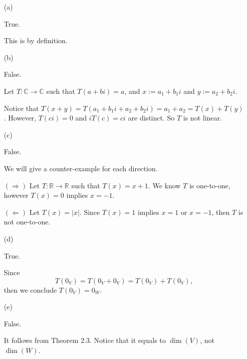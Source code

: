 \begin{Exercise}
	\begin{enumerate}[(a)]
		\item[(a)]
		\begin{answer}
			True.
		\end{answer}
		\begin{solution}
			This is by definition.
		\end{solution}
		
		\item[(b)]
		\begin{answer}
			False.
		\end{answer}
		\begin{solution}
			Let $T:\mathbb{C}\to\mathbb{C}$ such that $T(a+b i) = a$, and $x := a_1 + b_1 i$ and $y := a_2 + b_2 i$.
			
			Notice that $T(x+y) = T(a_1 + b_1 i + a_2 + b_2 i) = a_1 + a_2 = T(x) + T(y)$. However, $T(c i) = 0$ and $i T(c) = c i$ are distinct. So $T$ is not linear.
		\end{solution}
		
		\item[(c)]
		\begin{answer}
			False.
		\end{answer}
		\begin{solution}
			We will give a counter-example for each direction.
			
			$(\Longrightarrow)$
			Let $T:\mathbb{R}\to\mathbb{R}$ such that $T(x) = x+1$. We know $T$ is one-to-one, however $T(x) = 0$ implies $x=-1$.
			
			\vspace{2ex}
			
			$(\Longleftarrow)$
			Let $T(x) = |x|$. Since $T(x) = 1$ implies $x = 1$ or $x=-1$, then $T$ is not one-to-one.
		\end{solution}
		
		\item[(d)]
		\begin{answer}
			True.
		\end{answer}
		\begin{solution}
			Since
			$$
			T(0_V) = T(0_V+0_V) = T(0_V) + T(0_V),
			$$
			then we conclude $T(0_V) = 0_W$.
		\end{solution}
		
		\item[(e)]
		\begin{answer}
			False.
		\end{answer}
		\begin{solution}
			It follows from Theorem 2.3. Notice that it equals to $\dim(V)$, not $\dim(W)$.
		\end{solution}
		

\end{enumerate}
\end{Exercise}

